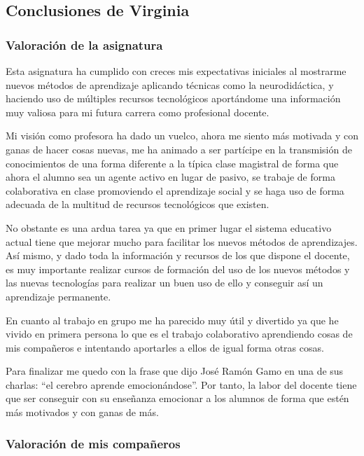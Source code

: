 \subsection{Conclusiones de Virginia}
\begin{leftbar}{\virgicolor}


\subsubsection{Valoración de la asignatura}
Esta asignatura ha cumplido con creces mis expectativas iniciales al mostrarme nuevos métodos de aprendizaje aplicando técnicas como la neurodidáctica, y haciendo uso de múltiples recursos tecnológicos aportándome una información muy valiosa para mi futura carrera como profesional docente.

Mi visión como profesora ha dado un vuelco, ahora me siento más motivada y con ganas de hacer cosas nuevas, me ha animado a ser partícipe en la transmisión de conocimientos de una forma diferente a la típica clase magistral de forma que ahora el alumno sea un agente activo en lugar de pasivo, se trabaje de forma colaborativa en clase promoviendo el aprendizaje social y se haga uso de forma adecuada de la multitud de recursos tecnológicos que existen.

No obstante es una ardua tarea ya que en primer lugar el sistema educativo actual tiene que mejorar mucho para facilitar los nuevos métodos de aprendizajes. Así mismo, y dado toda la información y recursos de los que dispone el docente, es muy importante realizar cursos de formación del uso de los nuevos métodos y las nuevas tecnologías para realizar un buen uso de ello y conseguir así un aprendizaje permanente.

En cuanto al trabajo en grupo me ha parecido muy útil y divertido ya que he vivido en primera persona lo que es el trabajo colaborativo aprendiendo cosas de mis compañeros e intentando aportarles a ellos de igual forma otras cosas.

Para finalizar me quedo con la frase que dijo José Ramón Gamo en una de sus charlas: “el cerebro aprende emocionándose”. Por tanto, la labor del docente tiene que ser conseguir con su enseñanza emocionar a los alumnos de forma que estén más motivados y con ganas de más.

\subsubsection{Valoración de mis compañeros}



\end{leftbar}
